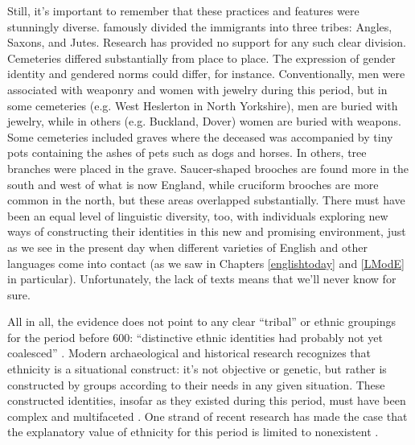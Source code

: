 Still, it's important to remember that these practices and features were stunningly diverse.  famously divided the immigrants into three tribes: Angles, Saxons, and Jutes. Research has provided no support for any such clear division. Cemeteries differed substantially from place to place. The expression of gender identity and gendered norms could differ, for instance. Conventionally, men were associated with weaponry and women with jewelry during this period, but in some cemeteries (e.g. West Heslerton in North Yorkshire), men are buried with jewelry, while in others (e.g. Buckland, Dover) women are buried with weapons. Some cemeteries included graves where the deceased was accompanied by tiny pots containing the ashes of pets such as dogs and horses. In others, tree branches were placed in the grave. Saucer-shaped brooches are found more in the south and west of what is now England, while cruciform brooches are more common in the north, but these areas overlapped substantially. There must have been an equal level of linguistic diversity, too, with individuals exploring new ways of constructing their identities in this new and promising environment, just as we see in the present day when different varieties of English and other languages come into contact (as we saw in Chapters \ref{englishtoday} and \ref{LModE} in particular). Unfortunately, the lack of texts means that we'll never know for sure.

All in all, the evidence does not point to any clear ``tribal'' or ethnic groupings for the period before 600: ``distinctive ethnic identities had probably not yet coalesced'' \citep[49]{Fleming2010}. Modern archaeological and historical research recognizes that ethnicity is a situational construct: it's not objective or genetic, but rather is constructed by groups according to their needs in any given situation. These constructed identities, insofar as they existed during this period, must have been complex and multifaceted \citep{Hills2015,Martin2015}. One strand of recent research has made the case that the explanatory value of ethnicity for this period is limited to nonexistent \citep{Harland2017,Harland2019,Oosthuizen2019}.


